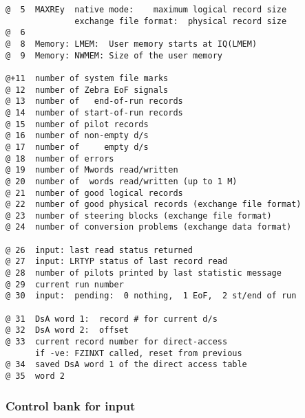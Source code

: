 \begin{verbatim}
@  5  MAXREy  native mode:    maximum logical record size
              exchange file format:  physical record size
@  6
@  8  Memory: LMEM:  User memory starts at IQ(LMEM)
@  9  Memory: NWMEM: Size of the user memory

@+11  number of system file marks
@ 12  number of Zebra EoF signals
@ 13  number of   end-of-run records
@ 14  number of start-of-run records
@ 15  number of pilot records
@ 16  number of non-empty d/s
@ 17  number of     empty d/s
@ 18  number of errors
@ 19  number of Mwords read/written
@ 20  number of  words read/written (up to 1 M)
@ 21  number of good logical records
@ 22  number of good physical records (exchange file format)
@ 23  number of steering blocks (exchange file format)
@ 24  number of conversion problems (exchange data format)

@ 26  input: last read status returned
@ 27  input: LRTYP status of last record read
@ 28  number of pilots printed by last statistic message
@ 29  current run number
@ 30  input:  pending:  0 nothing,  1 EoF,  2 st/end of run

@ 31  DsA word 1:  record # for current d/s
@ 32  DsA word 2:  offset
@ 33  current record number for direct-access
      if -ve: FZINXT called, reset from previous
@ 34  saved DsA word 1 of the direct access table
@ 35  word 2
\end{verbatim}

\subsubsection*{Control bank for input}

